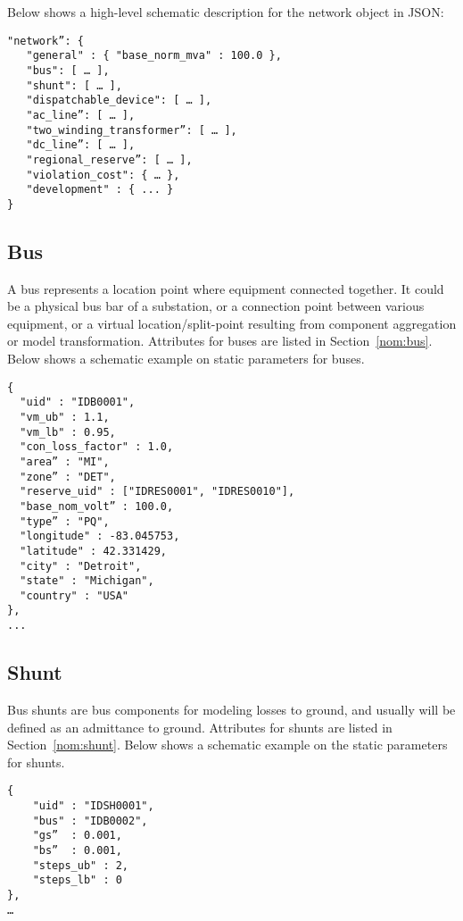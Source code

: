Below shows a high-level schematic description for the network object in JSON:
\begin{verbatim}
"network”: {
   "general" : { "base_norm_mva" : 100.0 },
   "bus": [ … ],
   "shunt": [ … ],
   "dispatchable_device": [ … ],
   "ac_line”: [ … ],
   "two_winding_transformer”: [ … ],
   "dc_line”: [ … ],   
   "regional_reserve”: [ … ],
   "violation_cost": { … },
   "development" : { ... }
}    
\end{verbatim}


\subsection{Bus}
\label{sec:bus}
A bus represents a location point where equipment connected together.
It could be a physical bus bar of a substation, or 
a connection point between various equipment, 
or a virtual location/split-point resulting from
component aggregation or model transformation.
Attributes for buses are listed in Section~\ref{nom:bus}.
Below shows a schematic example on static parameters for buses.
\begin{verbatim}
{
  "uid" : "IDB0001",
  "vm_ub" : 1.1,
  "vm_lb" : 0.95,
  "con_loss_factor" : 1.0,
  "area” : "MI",
  "zone” : "DET",
  "reserve_uid" : ["IDRES0001", "IDRES0010"],  
  "base_nom_volt” : 100.0,
  "type” : "PQ",
  "longitude" : -83.045753,
  "latitude" : 42.331429,
  "city" : "Detroit",
  "state" : "Michigan",
  "country" : "USA"
},
...
\end{verbatim}


\subsection{Shunt}
\label{sec:shunt}
Bus shunts are bus components for modeling losses to ground, and 
usually will be defined as an admittance to ground.
Attributes for shunts are listed in Section~\ref{nom:shunt}.
Below shows a schematic example on the static parameters for shunts.
\begin{verbatim}
{
    "uid" : "IDSH0001",
    "bus" : "IDB0002",
    "gs”  : 0.001,
    "bs”  : 0.001,
    "steps_ub" : 2,
    "steps_lb" : 0
},
…    
\end{verbatim}


